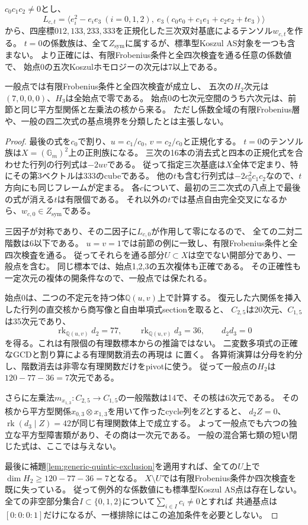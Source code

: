 \begin{theorem}[係数を動かした基点境界族の一様なAS排除]
\label{thm:generic-one-point-uniform-exclusion}
$c_0c_1c_2\ne0$とし、
\[
 L_{c,t}=\langle e_i^2-e_ie_3\ (i=0,1,2),\
                    e_3(c_0e_0+c_1e_1+c_2e_2+t e_3)\rangle
\]
から、四座標$012,133,233,333$を正規化した三次双対基底によるテンソル$w_{c,t}$を作る。
$t=0$の係数族は、全て$Z_{\mathrm{sym}}$に属するが、標準型Koszul AS対象を一つも含まない。
より正確には、有限Frobenius条件と全四次検査を通る任意の係数値で、
始点0の五次Koszulホモロジーの次元は7以上である。

一般点では有限Frobenius条件と全四次検査が成立し、
五次の$H_2$次元は$(7,0,0,0)$、$H_3$は全始点で零である。
始点0の七次元空間のうち六次元は、前節と同じ平方型関係と左乗法の核から来る。
ただし係数全域の有限Frobenius層や、一般の四二次式の基点境界を分類したとは主張しない。
\end{theorem}
\begin{proof}
最後の式を$c_0$で割り、$u=c_1/c_0$, $v=c_2/c_0$と正規化する。
$t=0$のテンソル族は$X=(\mathbb G_m)^2$上の正則族になる。
三次の16本の消去式と四本の正規化式を合わせた行列の行列式は$-2uv$である。
従って指定三次基底は$X$全体で定まり、特にその第3ベクトルは$333$のcubeである。
他の$t$も含む行列式は$-2c_0^2c_1c_2$なので、$t$方向にも同じフレームが定まる。
各$c$について、最初の三二次式の八点上で最後の式が消える$t$は有限個である。
それ以外の$t$では基点自由完全交叉になるから、$w_{c,0}\in Z_{\mathrm{sym}}$である。

三因子が対称であり、その二因子に$L_{c,0}$が作用して零になるので、
全ての二対二階数は6以下である。
$u=v=1$では前節の例に一致し、有限Frobenius条件と全四次検査を通る。
従ってそれらを通る部分$U\subset X$は空でない開部分であり、一般点を含む。
同じ標本では、始点1,2,3の五次複体も正確である。
その正確性も一定次元の複体の開条件なので、一般点では保たれる。

始点0は、二つの不定元を持つ体$\mathbb Q(u,v)$上で計算する。
復元した六関係を挿入した行列の直交核から商写像と自由単項式sectionを取ると、
$C_{2,5}$は20次元、$C_{1,5}$は35次元であり、
\[
 \operatorname{rk}_{\mathbb Q(u,v)}d_2=77,\qquad
 \operatorname{rk}_{\mathbb Q(u,v)}d_3=36,\qquad d_2d_3=0
\]
を得る。これは有限個の有理数標本からの推論ではない。
二変数多項式の正確なGCDと割り算による有理関数消去の再現は
に置く。
各算術演算は分母を約分し、階数消去は非零な有理関数だけをpivotに使う。
従って一般点の$H_2$は$120-77-36=7$次元である。

さらに左乗法$m_{x_{1,3}}:C_{2,5}\to C_{1,5}$の一般階数は14で、その核は6次元である。
その核から平方型関係$x_{0,3}\otimes x_{1,3}$を用いて作ったcycle列を$Z$とすると、
$d_2Z=0$、$\operatorname{rk}(d_3\mid Z)=42$が同じ有理関数体上で成立する。
よって一般点でも六つの独立な平方型障害類があり、その商は一次元である。
一般の混合第七類の短い閉じた式は、ここでは与えない。

最後に補題\ref{lem:generic-quintic-exclusion}を適用すれば、全ての$U$上で
$\dim H_2\geq120-77-36=7$となる。
$X\setminus U$では有限Frobenius条件か四次検査を既に失っている。
従って例外的な係数値にも標準型Koszul AS点は存在しない。
全ての非空部分集合$I\subset\{0,1,2\}$について$\sum_{i\in I}c_i\ne0$とすれば
共通基点は$[0:0:0:1]$だけになるが、一様排除にはこの追加条件を必要としない。
\end{proof}
